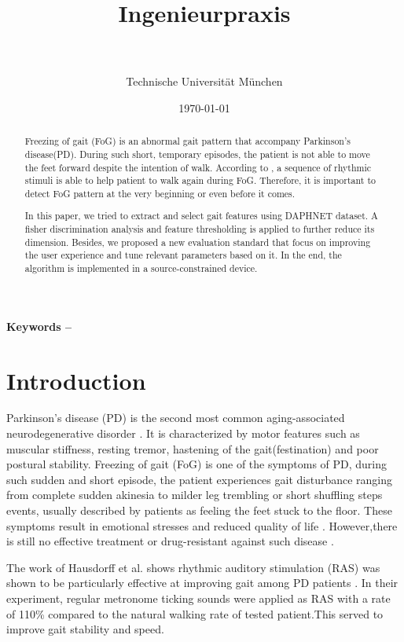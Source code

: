 \documentclass[article]{article}
\title{Ingenieurpraxis\\\mytitle}
\author{\myauthor\hspace{1em}\\\contact\\Technische Universität München}
\date{\today}
\begin{document}
\maketitle

\begin{abstract}
    Freezing of gait (FoG) is an abnormal gait pattern that accompany Parkinson's disease(PD). During such short, temporary episodes, the patient is not able to move the feet forward despite the intention of walk. According to  \cite{RAS}, a sequence of rhythmic stimuli is able to help patient to walk again during FoG. Therefore, it is important to detect FoG pattern at the very beginning or even before it comes.
    
    In this paper, we tried to extract and select gait features using DAPHNET dataset. A fisher discrimination analysis and feature thresholding is applied to further reduce its dimension. Besides, we proposed a new evaluation standard that focus on improving the user experience and tune relevant parameters based on it. In the end, the algorithm is implemented in a source-constrained device.
    
\end{abstract}  
\textbf{Keywords -- }{\mykeywords}

\section{Introduction}
    Parkinson's disease (PD) is the second most common aging-associated neurodegenerative disorder \cite{PD}. It is characterized by motor features such as muscular stiffness, resting tremor, hastening of the gait(festination) and poor postural stability. Freezing of gait (FoG) is one of the symptoms of PD, during such sudden and short episode, the patient experiences gait disturbance ranging from complete sudden akinesia to milder leg trembling or short shuffling steps events, usually described by patients as feeling the feet stuck to the floor. These symptoms result in emotional stresses and reduced quality of life \cite{PD1}. However,there is still no effective treatment or drug-resistant against such disease \cite{medicin}.
    
    The work of Hausdorff et al. shows rhythmic auditory stimulation (RAS) was shown to be particularly effective at improving gait among PD patients \cite{RAS1}. In their experiment, regular metronome ticking sounds were applied as RAS with a rate of 110\% compared to the natural walking rate of tested patient.This served to improve gait stability and speed.
 	
\end{document}
